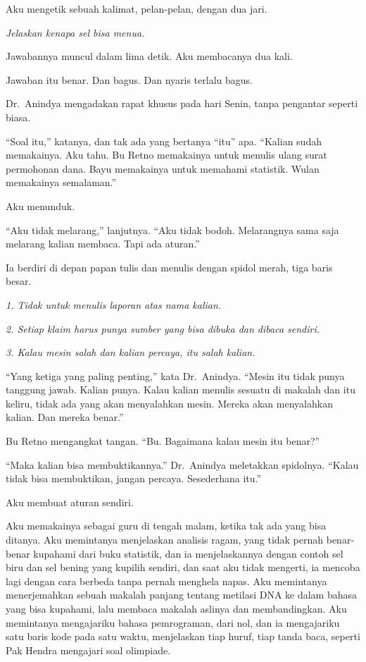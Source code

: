 \documentclass[11pt,twoside,openany]{book}
\makeatletter
\newcommand{\scenebreak}{\par\vspace{0.9em}{\centering\textsc{*\hspace{0.7em}*\hspace{0.7em}*}\par}\vspace{0.9em}\@afterindentfalse\@afterheading}
\makeatother
\begin{document}
Aku mengetik sebuah kalimat, pelan-pelan, dengan dua jari.

\emph{Jelaskan kenapa sel bisa menua.}

Jawabannya muncul dalam lima detik. Aku membacanya dua kali.

Jawaban itu benar. Dan bagus. Dan nyaris terlalu bagus.

\scenebreak
Dr.~Anindya mengadakan rapat khusus pada hari Senin, tanpa pengantar seperti biasa.

``Soal itu,'' katanya, dan tak ada yang bertanya ``itu'' apa. ``Kalian sudah memakainya. Aku tahu. Bu Retno memakainya untuk menulis ulang surat permohonan dana. Bayu memakainya untuk memahami statistik. Wulan memakainya semalaman.''

Aku menunduk.

``Aku tidak melarang,'' lanjutnya. ``Aku tidak bodoh. Melarangnya sama saja melarang kalian membaca. Tapi ada aturan.''

Ia berdiri di depan papan tulis dan menulis dengan spidol merah, tiga baris besar.

\emph{1. Tidak untuk menulis laporan atas nama kalian.}

\emph{2. Setiap klaim harus punya sumber yang bisa dibuka dan dibaca sendiri.}

\emph{3. Kalau mesin salah dan kalian percaya, itu salah kalian.}

``Yang ketiga yang paling penting,'' kata Dr.~Anindya. ``Mesin itu tidak punya tanggung jawab. Kalian punya. Kalau kalian menulis sesuatu di makalah dan itu keliru, tidak ada yang akan menyalahkan mesin. Mereka akan menyalahkan kalian. Dan mereka benar.''

Bu Retno mengangkat tangan. ``Bu. Bagaimana kalau mesin itu benar?''

``Maka kalian bisa membuktikannya.'' Dr.~Anindya meletakkan spidolnya. ``Kalau tidak bisa membuktikan, jangan percaya. Sesederhana itu.''

\scenebreak
Aku membuat aturan sendiri.

Aku memakainya sebagai guru di tengah malam, ketika tak ada yang bisa ditanya. Aku memintanya menjelaskan analisis ragam, yang tidak pernah benar-benar kupahami dari buku statistik, dan ia menjelaskannya dengan contoh sel biru dan sel bening yang kupilih sendiri, dan saat aku tidak mengerti, ia mencoba lagi dengan cara berbeda tanpa pernah menghela napas. Aku memintanya menerjemahkan sebuah makalah panjang tentang metilasi DNA ke dalam bahasa yang bisa kupahami, lalu membaca makalah aslinya dan membandingkan. Aku memintanya mengajariku bahasa pemrograman, dari nol, dan ia mengajariku satu baris kode pada satu waktu, menjelaskan tiap huruf, tiap tanda baca, seperti Pak Hendra mengajari soal olimpiade.
\end{document}
